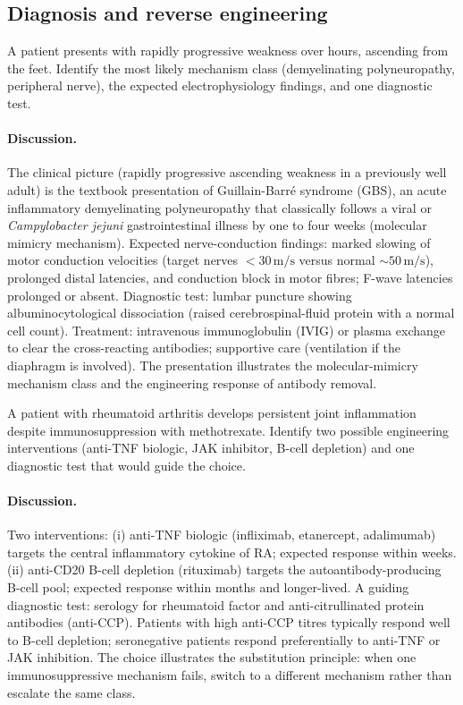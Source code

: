 \subsection*{Diagnosis and reverse engineering}

\begin{exercise}
A patient presents with rapidly progressive weakness over hours,
ascending from the feet. Identify the most likely mechanism class
(demyelinating polyneuropathy, peripheral nerve), the expected
electrophysiology findings, and one diagnostic test.
\end{exercise}

\paragraph{Discussion.}
The clinical picture (rapidly progressive ascending weakness in a
previously well adult) is the textbook presentation of Guillain-Barr\'{e}
syndrome (GBS), an acute inflammatory demyelinating polyneuropathy
that classically follows a viral or \emph{Campylobacter jejuni}
gastrointestinal illness by one to four weeks (molecular mimicry
mechanism). Expected nerve-conduction findings: marked slowing of
motor conduction velocities (target nerves $< 30\,\text{m/s}$ versus
normal $\sim 50\,\text{m/s}$), prolonged distal latencies, and
conduction block in motor fibres; F-wave latencies prolonged or
absent. Diagnostic test: lumbar puncture showing albuminocytological
dissociation (raised cerebrospinal-fluid protein with a normal cell
count). Treatment: intravenous immunoglobulin (IVIG) or plasma
exchange to clear the cross-reacting antibodies; supportive care
(ventilation if the diaphragm is involved). The presentation
illustrates the molecular-mimicry mechanism class and the engineering
response of antibody removal.

\begin{exercise}
A patient with rheumatoid arthritis develops persistent joint
inflammation despite immunosuppression with methotrexate. Identify
two possible engineering interventions (anti-TNF biologic, JAK
inhibitor, B-cell depletion) and one diagnostic test that would
guide the choice.
\end{exercise}

\paragraph{Discussion.}
Two interventions: (i) anti-TNF biologic (infliximab, etanercept,
adalimumab) targets the central inflammatory cytokine of RA;
expected response within weeks. (ii) anti-CD20 B-cell depletion
(rituximab) targets the autoantibody-producing B-cell pool; expected
response within months and longer-lived. A guiding diagnostic test:
serology for rheumatoid factor and anti-citrullinated protein
antibodies (anti-CCP). Patients with high anti-CCP titres typically
respond well to B-cell depletion; seronegative patients respond
preferentially to anti-TNF or JAK inhibition. The choice illustrates
the substitution principle: when one immunosuppressive mechanism
fails, switch to a different mechanism rather than escalate the same
class.


